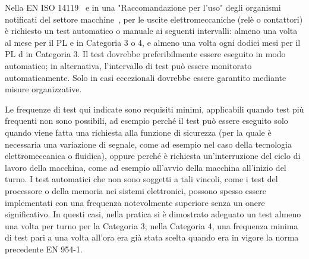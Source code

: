 Nella EN ISO 14119~\cite{eniso14119} e in una "Raccomandazione per l'uso" degli organismi notificati del settore macchine~\cite{rfu2015}, per le uscite elettromeccaniche (relè o contattori) è richiesto un test automatico o manuale ai seguenti intervalli: almeno una volta al mese per il PL e in Categoria 3 o 4, e almeno una volta ogni dodici mesi per il PL d in Categoria 3. Il test dovrebbe preferibilmente essere eseguito in modo automatico; in alternativa, l'intervallo di test può essere monitorato automaticamente. Solo in casi eccezionali dovrebbe essere garantito mediante misure organizzative.

Le frequenze di test qui indicate sono requisiti minimi, applicabili quando test più frequenti non sono possibili, ad esempio perché il test può essere eseguito solo quando viene fatta una richiesta alla funzione di sicurezza (per la quale è necessaria una variazione di segnale, come ad esempio nel caso della tecnologia elettromeccanica o fluidica), oppure perché è richiesta un'interruzione del ciclo di lavoro della macchina, come ad esempio all'avvio della macchina all'inizio del turno. I test automatici che non sono soggetti a tali vincoli, come i test del processore o della memoria nei sistemi elettronici, possono spesso essere implementati con una frequenza notevolmente superiore senza un onere significativo. In questi casi, nella pratica si è dimostrato adeguato un test almeno una volta per turno per la Categoria 3; nella Categoria 4, una frequenza minima di test pari a una volta all'ora era già stata scelta quando era in vigore la norma precedente EN 954-1.


